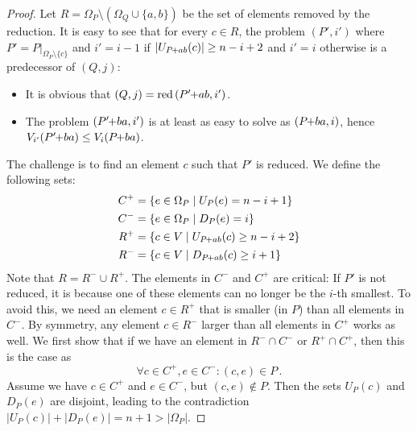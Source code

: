 \documentclass[twoside,leqno,twocolumn]{article}
\newcommand{\pchild}[3]{{#1}\kern-1pt{+}{#2}{#3}}
\newcommand{\reduced}[1]{\operatorname{red}{#1}}
\newcommand{\less}[2]{D_{#1}(#2)}
\newcommand{\greater}[2]{U_{#1}(#2)}
\begin{document}
\begin{proof}
  Let $R = \Omega_P \setminus (\Omega_Q \cup \{a, b\})$ be the set of elements removed by the reduction.
  It is easy to see that for every $c \in R$, the problem $(P', i')$ where $P' = P|_{\Omega_P \setminus \{c\}}$ and $i' = i - 1$ if $|\greater{\pchild{P}{a}{b}}{c}| \ge n - i + 2$ and $i' = i$ otherwise is a predecessor of $(Q, j)$:
  \begin{itemize}
    \item It is obvious that $(Q, j) = \reduced{(\pchild{P'}{a}{b}, i')}$.
    \item The problem $(\pchild{P'}{b}{a}, i')$ is at least as easy to solve as $(\pchild{P}{b}{a}, i)$, hence $V_{i'}(\pchild{P'}{b}{a}) \leq V_i(\pchild{P}{b}{a})$.
  \end{itemize}
  The challenge is to find an element $c$ such that $P'$ is reduced.
  We define the following sets:
  \begin{align*}
    C^+ & = \{e \in \Omega_P \mid \greater{P}{e} = n - i + 1\}            \\
    C^- & = \{e \in \Omega_P \mid \less{P}{e} = i \}                      \\
    R^+ & = \{c \in V \mid \greater{\pchild{P}{a}{b}}{c} \ge n - i + 2 \} \\
    R^- & = \{c \in V \mid \less{\pchild{P}{a}{b}}{c} \ge i + 1 \}
  \end{align*}
  Note that $R = R^- \cup R^+$.
  The elements in $C^-$ and $C^+$ are critical:
  If $P'$ is not reduced, it is because one of these elements can no longer be the $i$-th smallest.
  To avoid this, we need an element $c \in R^+$ that is smaller (in $P$) than all elements in $C^-$.
  By symmetry, any element $c \in R^-$ larger than all elements in $C^+$ works as well.
  We first show that if we have an element in $R^- \cap C^-$ or $R^+ \cap C^+$, then this is the case as
  \begin{equation}
    \forall c \in C^+, e \in C^- \colon (c, e) \in P\,\text{.}
  \end{equation}
  Assume we have $c \in C^+$ and $e \in C^-$, but $(c, e) \notin P$.
  Then the sets $\greater{P}{c}$ and $\less{P}{e}$ are disjoint, leading to the contradiction $|\greater{P}{c}| + |\less{P}{e}| = n + 1 > |\Omega_P|$.


\end{proof}
\end{document}
